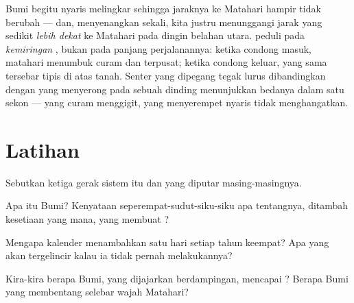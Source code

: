 \begin{remark}\label{rem:g6:sun-earth-moon:notdistance}
 Bumi begitu nyaris melingkar sehingga jaraknya ke Matahari
hampir tidak berubah --- dan, menyenangkan sekali, kita justru
menunggangi jarak yang sedikit \emph{lebih dekat} ke Matahari pada
 dingin belahan utara.  peduli pada \emph{kemiringan}
, bukan pada panjang perjalanannya: ketika condong masuk,
 matahari menumbuk curam dan terpusat; ketika condong keluar,
 yang sama tersebar tipis di atas tanah. Senter yang dipegang
tegak lurus dibandingkan dengan yang menyerong pada sebuah dinding
menunjukkan bedanya dalam satu sekon ---  yang curam menggigit,
 yang menyerempet nyaris tidak menghangatkan.
\end{remark}

\section{Latihan}

\begin{exercise}[$\star$]\label{exo:g6:sun-earth-moon:1}
Sebutkan ketiga gerak sistem itu dan  yang diputar
masing-masingnya.
\end{exercise}

\begin{exercise}[$\star$]\label{exo:g6:sun-earth-moon:2}
Apa itu  Bumi? Kenyataan seperempat-sudut-siku-siku apa
tentangnya, ditambah kesetiaan yang mana, yang membuat ?
\end{exercise}

\begin{exercise}[$\star$]\label{exo:g6:sun-earth-moon:3}
Mengapa kalender menambahkan satu hari setiap tahun keempat? Apa yang
akan tergelincir kalau ia tidak pernah melakukannya?
\end{exercise}

\begin{exercise}[$\star$]\label{exo:g6:sun-earth-moon:4}
Kira-kira berapa Bumi, yang dijajarkan berdampingan, mencapai ?
Berapa Bumi yang membentang selebar wajah Matahari?
\end{exercise}

